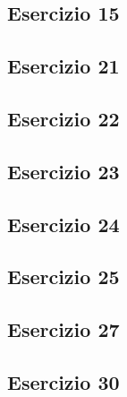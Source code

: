 \subsection{Esercizio 15}


\subsection{Esercizio 21}


\subsection{Esercizio 22}


\subsection{Esercizio 23}


\subsection{Esercizio 24}


\subsection{Esercizio 25}


\subsection{Esercizio 27}


\subsection{Esercizio 30}

